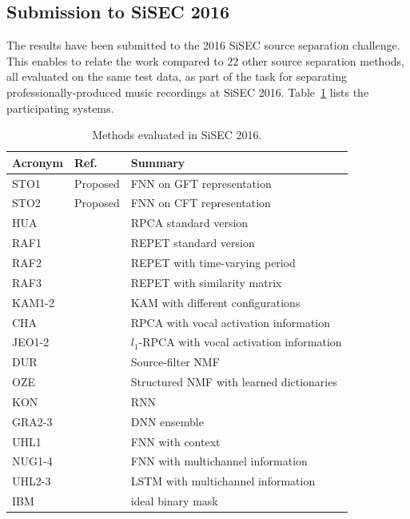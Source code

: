 \subsection{Submission to SiSEC 2016}
\label{ssec:performance}


The results have been submitted to the 2016 SiSEC source separation challenge.
This enables to relate the work compared to $22$ other source separation methods, all evaluated on the same test data, as part of the task for separating professionally-produced music recordings at SiSEC 2016.
Table~\ref{tab:sisec_systems} lists the participating systems.
\begin{table}[htbp]
  \centering
  \scriptsize
	\begin{tabular}{lll@{}}
		\hline
		\textbf{Acronym} & \textbf{Ref.} & \textbf{Summary}\\
		\hline
    STO1 & Proposed & FNN on GFT representation \\
    STO2 & Proposed & FNN on CFT representation \\
		HUA & \cite{huang12} & RPCA standard version \\
		RAF1 & \cite{rafii13} & REPET standard version \\
		RAF2 & \cite{liutkus12} & REPET with time-varying period \\
		RAF3 & \cite{rafii12} & REPET with similarity matrix \\
		KAM1-2 & \cite{liutkus15} & KAM with different configurations \\
		CHA & \cite{chan15} & RPCA with vocal activation information \\
		JEO1-2 & \cite{jeong17} &  $l_1$-RPCA with vocal activation information \\
		DUR & \cite{durrieu11} & Source-filter NMF \\
		OZE & \cite{salaun14} & Structured NMF with learned dictionaries \\
		KON & \cite{huang15} & RNN \\
		GRA2-3 & \cite{grais16} & DNN ensemble \\
		UHL1 & \cite{uhlich15} & FNN with context \\
		NUG1-4 & \cite{nugraha16} & FNN with multichannel information \\
		UHL2-3 & \cite{uhlich17} & LSTM with multichannel information \\
		IBM & & ideal binary mask \\
  \end{tabular}
 	\caption{Methods evaluated in SiSEC 2016.}
	\label{tab:sisec_systems}

\end{table}

